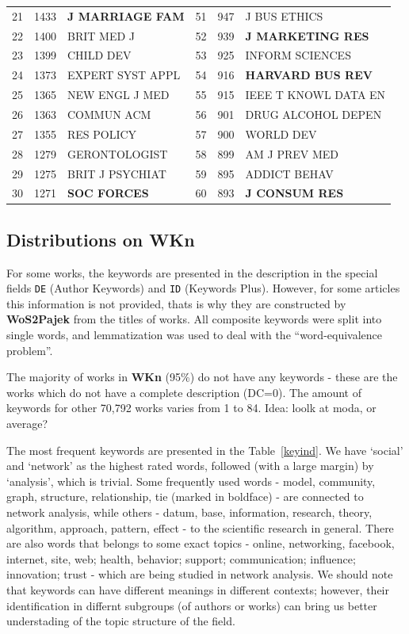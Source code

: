 \documentclass[11pt]{article} %
\begin{document}
\begin{table}
\begin{tabular}{c|r|l||c|r|l}
21&   	1433&   	\textbf{J MARRIAGE FAM}&   	51&   	947&   	J BUS ETHICS\\   
22&   	1400&   	BRIT MED J&   	52&   	939&   	\textbf{J MARKETING RES}\\   
23&   	1399&   	CHILD DEV&   	53&   	925&   	INFORM SCIENCES\\   
24&   	1373&   	EXPERT SYST APPL&   	54&   	916&   	\textbf{HARVARD BUS REV}\\   
25&   	1365&   	NEW ENGL J MED&   	55&   	915&   	IEEE T KNOWL DATA EN\\   
26&   	1363&   	COMMUN ACM&   	56&   	901&   	DRUG ALCOHOL DEPEN\\   
27&   	1355&   	RES POLICY&   	57&   	900&   	WORLD DEV\\   
28&   	1279&   	GERONTOLOGIST&   	58&   	899&   	AM J PREV MED\\   
29&   	1275&   	BRIT J PSYCHIAT&   	59&   	895&   	ADDICT BEHAV\\   
30&   	1271&   	\textbf{SOC FORCES}&   	60&   	893&   	\textbf{J CONSUM RES}\\  \hline
\end{tabular}

\end{table}

\subsection{Distributions on WKn}

For some works, the keywords are presented in the description in the special fields \texttt {DE} (Author Keywords) and \texttt {ID} (Keywords Plus). However, for some articles this information is not provided, thats is why they are constructed by \textbf{WoS2Pajek} from the titles of works. All composite keywords were split into single words, and lemmatization was used to deal with the ``word-equivalence problem''. \medskip

The majority of works in \textbf{WKn} (95\%) do not have any keywords - these are the works which do not have a complete description (DC=0). The amount of keywords for other 70,792 works varies from 1 to 84. Idea: loolk at moda, or average? \medskip
 
The most frequent keywords are presented in the Table~\ref{keyind}. We have `social' and `network' as the highest rated words, followed (with a large margin) by `analysis', which is trivial. Some frequently used words - model, community, graph, structure, relationship, tie (marked in boldface) - are connected to network analysis, while others - datum, base, information, research, theory, algorithm, approach, pattern, effect - to the scientific research in general. There are also words that belongs to some exact topics - online,  networking, facebook, internet, site, web; health, behavior; support; communication; influence; innovation; trust - which are being studied in network analysis. We should note that keywords can have different meanings in different contexts; however, their identification in differnt subgroups (of authors or works) can bring us better understading of the topic structure of the field. \medskip
\end{document}
